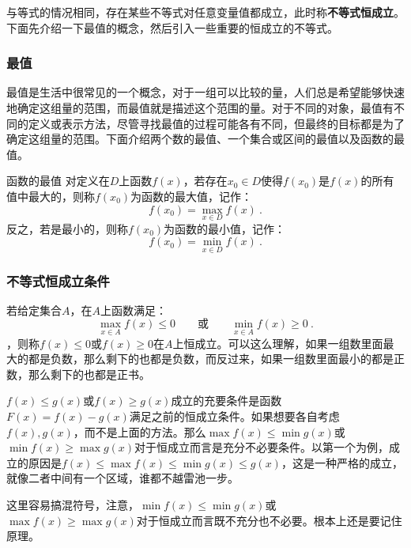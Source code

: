 与等式的情况相同，存在某些不等式对任意变量值都成立，此时称\textbf{不等式恒成立}。下面先介绍一下最值的概念，然后引入一些重要的恒成立的不等式。

\subsubsection{最值}

最值是生活中很常见的一个概念，对于一组可以比较的量，人们总是希望能够快速地确定这组量的范围，而最值就是描述这个范围的量。对于不同的对象，最值有不同的定义或表示方法，尽管寻找最值的过程可能各有不同，但最终的目标都是为了确定这组量的范围。下面介绍两个数的最值、一个集合或区间的最值以及函数的最值。

\begin{definition}{函数的最值}
对定义在$D$上函数$f(x)$，若存在$x_0\in D$使得$f(x_0)$是$f(x)$的所有值中最大的，则称$f(x_0)$为函数的最大值，记作：
\begin{equation}
f(x_0) = \max_{x \in D} f(x)~.
\end{equation}
反之，若是最小的，则称$f(x_0)$为函数的最小值，记作：
\begin{equation}
f(x_0) = \min_{x \in D} f(x)~.
\end{equation}
\end{definition}

\subsubsection{不等式恒成立条件}

若给定集合$A$，在$A$上函数满足：
\begin{equation}
\displaystyle\max_{x\in A} f(x)\leq 0\qquad\text{或}\qquad\min_{x\in A} f(x)\geq 0~.
\end{equation}
，则称$f(x)\leq 0$或$f(x)\geq 0$在$A$上恒成立。可以这么理解，如果一组数里面最大的都是负数，那么剩下的也都是负数，而反过来，如果一组数里面最小的都是正数，那么剩下的也都是正书。

$f(x)\leq g(x)$或$f(x)\geq g(x)$成立的充要条件是函数$F(x)=f(x)-g(x)$满足之前的恒成立条件。如果想要各自考虑$f(x),g(x)$，而不是上面的方法。那么$\max f(x)\leq\min g(x)$或$\min f(x)\geq\max g(x)$对于恒成立而言是充分不必要条件。以第一个为例，成立的原因是$f(x)\leq\max f(x)\leq\min g(x)\leq g(x)$，这是一种严格的成立，就像二者中间有一个区域，谁都不越雷池一步。

这里容易搞混符号，注意，$\min f(x)\leq\min g(x)$或$\max f(x)\geq\max g(x)$对于恒成立而言既不充分也不必要。根本上还是要记住原理。

